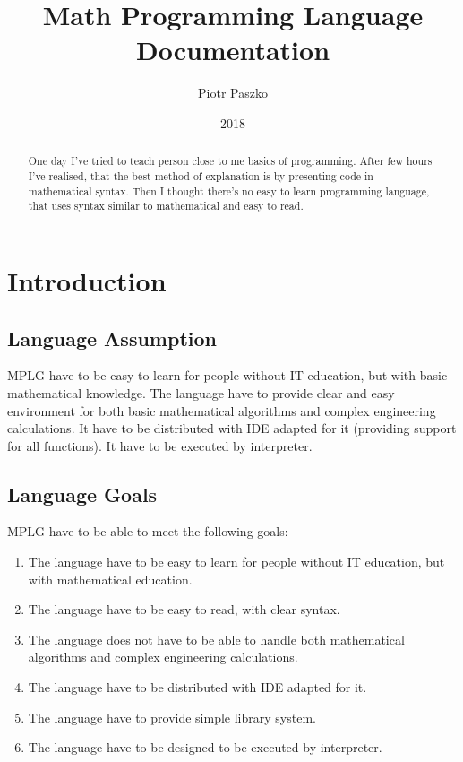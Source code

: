 \documentclass[a4paper]{report}
\title{Math Programming Language Documentation}
\author{Piotr Paszko}
\date{2018}
\begin{document}
\maketitle

\begin{abstract}
One day I've tried to teach person close to me basics of programming. After few hours I've realised, that the best method of explanation is by presenting code in mathematical syntax. Then I thought there's no easy to learn programming language, that uses syntax similar to mathematical and easy to read.
\end{abstract}

\tableofcontents

\chapter{Introduction}
\section{Language Assumption}
MPLG have to be easy to learn for people without IT education, but with basic mathematical knowledge. The language have to provide clear and easy environment for both basic mathematical algorithms and complex engineering calculations. It have to be distributed with IDE adapted for it (providing support for all functions). It have to be executed by interpreter.

\section{Language Goals}
MPLG have to be able to meet the following goals:
\begin{enumerate}
  \item The language have to be easy to learn for people without IT education, but with mathematical education.
  \item The language have to be easy to read, with clear syntax.
  \item The language does not have to be able to handle both mathematical algorithms and complex engineering calculations. 
  \item The language have to be distributed with IDE adapted for it.
  \item The language have to provide simple library system.
  \item The language have to be designed to be executed by interpreter.
\end{enumerate}
\end{document}
